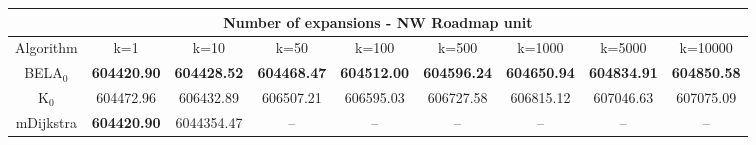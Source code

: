 \begin{tabular}{c|cccccccc}\toprule
\multicolumn{9}{c}{Number of expansions - NW Roadmap unit}\\ \midrule
Algorithm & k=1 & k=10 & k=50 & k=100 & k=500 & k=1000 & k=5000 & k=10000 \\ \midrule
BELA$_0$ & \textbf{604420.90} & \textbf{604428.52} & \textbf{604468.47} & \textbf{604512.00} & \textbf{604596.24} & \textbf{604650.94} & \textbf{604834.91} & \textbf{604850.58} \\
K$_0$ & 604472.96 & 606432.89 & 606507.21 & 606595.03 & 606727.58 & 606815.12 & 607046.63 & 607075.09 \\
mDijkstra & \textbf{604420.90} & 6044354.47 & -- & -- & -- & -- & -- & -- \\ \bottomrule 
\end{tabular}
